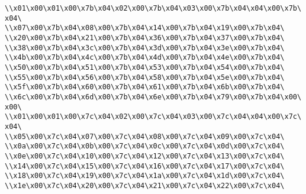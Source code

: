 \verb|\\x01\x00\x01\x00\x7b\x04\x02\x00\x7b\x04\x03\x00\x7b\x04\x04\x00\x7b\x04\|\newline
\verb|\\x07\x00\x7b\x04\x08\x00\x7b\x04\x14\x00\x7b\x04\x19\x00\x7b\x04\|\newline
\verb|\\x20\x00\x7b\x04\x21\x00\x7b\x04\x36\x00\x7b\x04\x37\x00\x7b\x04\|\newline
\verb|\\x38\x00\x7b\x04\x3c\x00\x7b\x04\x3d\x00\x7b\x04\x3e\x00\x7b\x04\|\newline
\verb|\\x4b\x00\x7b\x04\x4c\x00\x7b\x04\x4d\x00\x7b\x04\x4e\x00\x7b\x04\|\newline
\verb|\\x50\x00\x7b\x04\x51\x00\x7b\x04\x53\x00\x7b\x04\x54\x00\x7b\x04\|\newline
\verb|\\x55\x00\x7b\x04\x56\x00\x7b\x04\x58\x00\x7b\x04\x5e\x00\x7b\x04\|\newline
\verb|\\x5f\x00\x7b\x04\x60\x00\x7b\x04\x61\x00\x7b\x04\x6b\x00\x7b\x04\|\newline
\verb|\\x6c\x00\x7b\x04\x6d\x00\x7b\x04\x6e\x00\x7b\x04\x79\x00\x7b\x04\x00\x00\|\newline
\verb|\\x01\x00\x01\x00\x7c\x04\x02\x00\x7c\x04\x03\x00\x7c\x04\x04\x00\x7c\x04\|\newline
\verb|\\x05\x00\x7c\x04\x07\x00\x7c\x04\x08\x00\x7c\x04\x09\x00\x7c\x04\|\newline
\verb|\\x0a\x00\x7c\x04\x0b\x00\x7c\x04\x0c\x00\x7c\x04\x0d\x00\x7c\x04\|\newline
\verb|\\x0e\x00\x7c\x04\x10\x00\x7c\x04\x12\x00\x7c\x04\x13\x00\x7c\x04\|\newline
\verb|\\x14\x00\x7c\x04\x15\x00\x7c\x04\x16\x00\x7c\x04\x17\x00\x7c\x04\|\newline
\verb|\\x18\x00\x7c\x04\x19\x00\x7c\x04\x1a\x00\x7c\x04\x1d\x00\x7c\x04\|\newline
\verb|\\x1e\x00\x7c\x04\x20\x00\x7c\x04\x21\x00\x7c\x04\x22\x00\x7c\x04\|\newline
